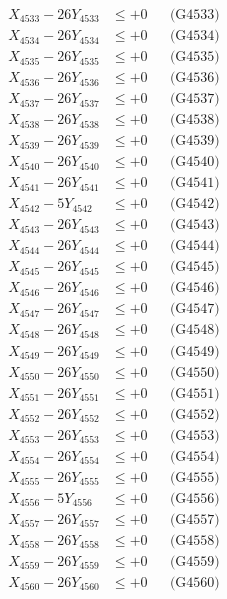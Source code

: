 \documentclass[a4paper,10pt]{article}
\begin{document}
{\begin{align}
X_{4533} - 26Y_{4533} &\leq +0 && \text{(G4533)} \\
X_{4534} - 26Y_{4534} &\leq +0 && \text{(G4534)} \\
X_{4535} - 26Y_{4535} &\leq +0 && \text{(G4535)} \\
X_{4536} - 26Y_{4536} &\leq +0 && \text{(G4536)} \\
X_{4537} - 26Y_{4537} &\leq +0 && \text{(G4537)} \\
X_{4538} - 26Y_{4538} &\leq +0 && \text{(G4538)} \\
X_{4539} - 26Y_{4539} &\leq +0 && \text{(G4539)} \\
X_{4540} - 26Y_{4540} &\leq +0 && \text{(G4540)} \\
\allowbreak
X_{4541} - 26Y_{4541} &\leq +0 && \text{(G4541)} \\
X_{4542} - 5Y_{4542} &\leq +0 && \text{(G4542)} \\
X_{4543} - 26Y_{4543} &\leq +0 && \text{(G4543)} \\
X_{4544} - 26Y_{4544} &\leq +0 && \text{(G4544)} \\
X_{4545} - 26Y_{4545} &\leq +0 && \text{(G4545)} \\
X_{4546} - 26Y_{4546} &\leq +0 && \text{(G4546)} \\
X_{4547} - 26Y_{4547} &\leq +0 && \text{(G4547)} \\
X_{4548} - 26Y_{4548} &\leq +0 && \text{(G4548)} \\
X_{4549} - 26Y_{4549} &\leq +0 && \text{(G4549)} \\
X_{4550} - 26Y_{4550} &\leq +0 && \text{(G4550)} \\
\allowbreak
X_{4551} - 26Y_{4551} &\leq +0 && \text{(G4551)} \\
X_{4552} - 26Y_{4552} &\leq +0 && \text{(G4552)} \\
X_{4553} - 26Y_{4553} &\leq +0 && \text{(G4553)} \\
X_{4554} - 26Y_{4554} &\leq +0 && \text{(G4554)} \\
X_{4555} - 26Y_{4555} &\leq +0 && \text{(G4555)} \\
X_{4556} - 5Y_{4556} &\leq +0 && \text{(G4556)} \\
X_{4557} - 26Y_{4557} &\leq +0 && \text{(G4557)} \\
X_{4558} - 26Y_{4558} &\leq +0 && \text{(G4558)} \\
X_{4559} - 26Y_{4559} &\leq +0 && \text{(G4559)} \\
X_{4560} - 26Y_{4560} &\leq +0 && \text{(G4560)} \\
\allowbreak

\end{align}}
\end{document}
